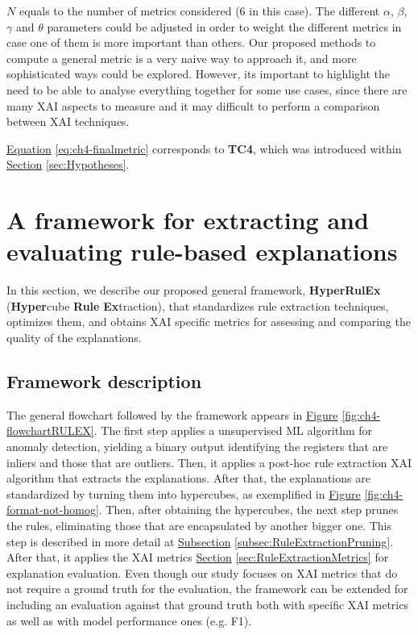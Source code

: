 $N$ equals to the number of metrics considered (6 in this case). The different $\alpha$, $\beta$, $\gamma$ and $\theta$ parameters could be adjusted in order to weight the different metrics in case one of them is more important than others. Our proposed methods to compute a general metric is a very naive way to approach it, and more sophisticated ways could be explored. However, its important to highlight the need to be able to analyse everything together for some use cases, since there are many XAI aspects to measure and it may difficult to perform a comparison between XAI techniques.

\hyperref[eq:ch4-finalmetric]{Equation} \ref{eq:ch4-finalmetric} corresponds to \textbf{TC4}, which was introduced within \hyperref[sec:Hypotheses]{Section} \ref{sec:Hypotheses}.

\section{A framework for extracting and evaluating rule-based explanations}\label{sec:RuleExtractionFramework}
In this section, we describe our proposed general framework, \textbf{HyperRulEx} (\textbf{Hyper}cube \textbf{Rule} \textbf{Ex}traction), that standardizes rule extraction techniques, optimizes them, and obtains XAI specific metrics for assessing and comparing the quality of the explanations.

\subsection{Framework description}\label{subsec:RuleExtractionFramework}
The general flowchart followed by the framework appears in \hyperref[fig:ch4-flowchartRULEX]{Figure} \ref{fig:ch4-flowchartRULEX}. The first step applies a unsupervised ML algorithm for anomaly detection, yielding a binary output identifying the registers that are inliers and those that are outliers. Then, it applies a post-hoc rule extraction XAI algorithm that extracts the explanations. After that, the explanations are standardized by turning them into hypercubes, as exemplified in 
\hyperref[fig:ch4-format-not-homog]{Figure} \ref{fig:ch4-format-not-homog}. Then, after obtaining the hypercubes, the next step prunes the rules, eliminating those that are encapsulated by another bigger one. This step is described in more detail at \hyperref[subsec:RuleExtractionPruning]{Subsection} \ref{subsec:RuleExtractionPruning}. After that, it applies the XAI metrics \hyperref[sec:RuleExtractionMetrics]{Section} \ref{sec:RuleExtractionMetrics} for explanation evaluation. Even though our study focuses on XAI metrics that do not require a ground truth for the evaluation, the framework can be extended for including an evaluation against that ground truth both with specific XAI metrics as well as with model performance ones (e.g. F1).

